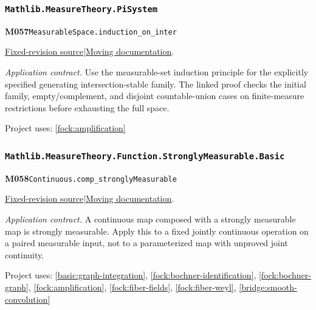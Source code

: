 \documentclass[11pt,a4paper]{article}
\theoremstyle{definition}
\theoremstyle{remark}
\begin{document}
\subsubsection*{\nolinkurl{Mathlib.MeasureTheory.PiSystem}}
\noindent\textbf{M057}\label{base:M057}\quad\nolinkurl{MeasurableSpace.induction_on_inter}

\href{https://github.com/leanprover-community/mathlib4/blob/9bac2d0692944a775113f7c130fd5e5b4608a854/Mathlib/MeasureTheory/PiSystem.lean}{Fixed-revision source}\quad|\quad\href{https://leanprover-community.github.io/mathlib4_docs/Mathlib/MeasureTheory/PiSystem.html#MeasurableSpace.induction_on_inter}{Moving documentation}.\par
\noindent\textit{Application contract.} Use the measurable-set induction principle for the explicitly specified generating intersection-stable family. The linked proof checks the initial family, empty/complement, and disjoint countable-union cases on finite-measure restrictions before exhausting the full space.\par
{\small Project uses: \ref{fock:amplification}}\par\medskip

\subsubsection*{\nolinkurl{Mathlib.MeasureTheory.Function.StronglyMeasurable.Basic}}
\noindent\textbf{M058}\label{base:M058}\quad\nolinkurl{Continuous.comp_stronglyMeasurable}

\href{https://github.com/leanprover-community/mathlib4/blob/9bac2d0692944a775113f7c130fd5e5b4608a854/Mathlib/MeasureTheory/Function/StronglyMeasurable/Basic.lean}{Fixed-revision source}\quad|\quad\href{https://leanprover-community.github.io/mathlib4_docs/Mathlib/MeasureTheory/Function/StronglyMeasurable/Basic.html#Continuous.comp_stronglyMeasurable}{Moving documentation}.\par
\noindent\textit{Application contract.} A continuous map composed with a strongly measurable map is strongly measurable. Apply this to a fixed jointly continuous operation on a paired measurable input, not to a parameterized map with unproved joint continuity.\par
{\small Project uses: \ref{basic:graph-integration}, \ref{fock:bochner-identification}, \ref{fock:bochner-graph}, \ref{fock:amplification}, \ref{fock:fiber-fields}, \ref{fock:fiber-weyl}, \ref{bridge:smooth-convolution}}\par\medskip
\end{document}
